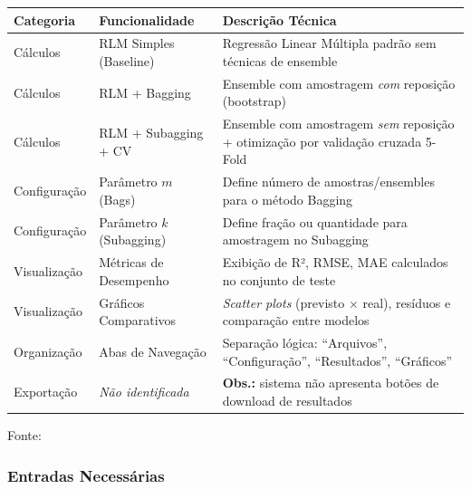 \begin{quadro}[ht]
\begin{center}
\small
\captionsetup{justification=centering, labelsep=endash, width=0.75\linewidth}
\caption{Inventário das funções do sistema}
\label{quadro:funcoes}
\begin{threeparttable}
\begin{tabularx}{\textwidth}{|l|l|X|} \hline
\textbf{Categoria} & \textbf{Funcionalidade} & \textbf{Descrição Técnica} \\ \hline
Cálculos & RLM Simples (Baseline) & Regressão Linear Múltipla padrão sem técnicas de ensemble \\ \hline
Cálculos & RLM + Bagging & Ensemble com amostragem \textit{com} reposição (bootstrap) \\ \hline
Cálculos & RLM + Subagging + CV & Ensemble com amostragem \textit{sem} reposição + otimização por validação cruzada 5-Fold \\ \hline
Configuração & Parâmetro $m$ (Bags) & Define número de amostras/ensembles para o método Bagging \\ \hline
Configuração & Parâmetro $k$ (Subagging) & Define fração ou quantidade para amostragem no Subagging \\ \hline
Visualização & Métricas de Desempenho & Exibição de R², RMSE, MAE calculados no conjunto de teste \\ \hline
Visualização & Gráficos Comparativos & \textit{Scatter plots} (previsto $\times$ real), resíduos e comparação entre modelos \\ \hline
Organização & Abas de Navegação & Separação lógica: ``Arquivos'', ``Configuração'', ``Resultados'', ``Gráficos'' \\ \hline
Exportação & \textit{Não identificada} & \textbf{Obs.:} sistema não apresenta botões de download de resultados \\ \hline
\end{tabularx}
\begin{tablenotes}[flushleft]
\footnotesize
\item Fonte:~\oautor
\end{tablenotes}
\end{threeparttable}
\end{center}
\end{quadro}

\newpage
\subsubsection{Entradas Necessárias}
\label{ssubsec:entradas}

